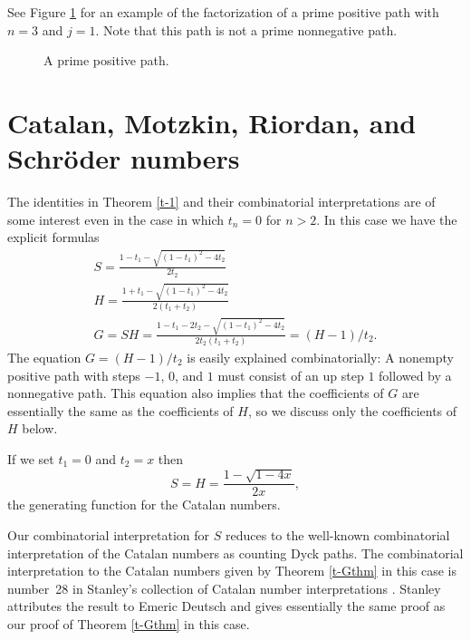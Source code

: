 \documentclass[12pt,reqno, oneside]{amsart}
\begin{document}
See Figure \ref{f-primepos} for an example of the factorization of a prime positive path with $n=3$ and  $j=1$. Note that this path is not a prime nonnegative path.
\begin{figure}[h]
\caption{A prime positive path.}
\label{f-primepos}
\end{figure}


\section{Catalan, Motzkin, Riordan, and Schr\"oder numbers}
\label{s-cat}
The identities in Theorem \ref{t-1} and their combinatorial interpretations are of some interest even in the case in which 
$t_n=0$ for $n>2$. In this case we have the explicit formulas
\begin{gather}
S = \frac{1-t_1 -\sqrt{(1-t_1)^2 -4t_2}}{2t_2}\label{e-S12}\\[3pt]
H =\frac{1+t_1-\sqrt{(1-t_1)^2 -4t_2}}{2(t_1+t_2)}\label{e-H12}\\[3pt]
G=SH = \frac{1-t_1 -2t_2 -\sqrt{(1-t_1)^2 -4t_2}}{2t_2(t_1+t_2)}=(H-1)/t_2.
\end{gather}
The equation $G=(H-1)/t_2$ is easily explained combinatorially: A nonempty positive path with steps $-1$, $0$, and $1$ must consist of an up step $1$ followed by a nonnegative path. This equation also implies that the coefficients of $G$ are essentially the same as the coefficients of $H$, so we discuss only  the coefficients of $H$ below.


If we set $t_1=0$ and  $t_2=x$ then
\begin{equation*}
S=H = \frac{1-\sqrt{1-4x}}{2x},
\end{equation*}
the generating function for the Catalan numbers.

Our combinatorial interpretation for $S$ reduces to the well-known combinatorial interpretation of the Catalan numbers as counting Dyck paths. The combinatorial interpretation to the Catalan numbers given by Theorem \ref{t-Gthm} in this case is number~28 in Stanley's collection of Catalan number interpretations \cite{stanley}. Stanley attributes the result to Emeric Deutsch and gives essentially the same proof as our proof of Theorem \ref{t-Gthm} in this case.
\end{document}
